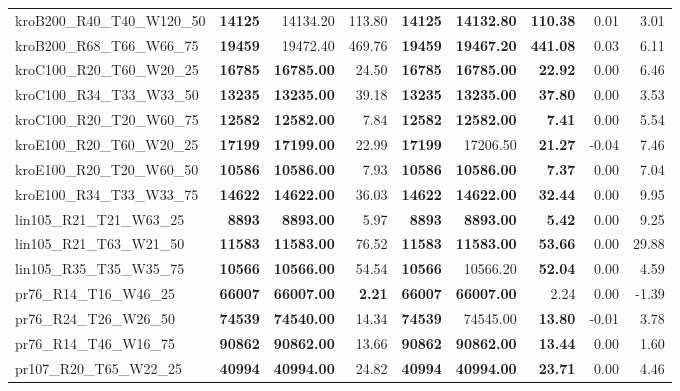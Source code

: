 \documentclass{singlecol-new}
\begin{document}
\begin{scriptsize}
\begin{longtable}{lrrrrrrrr}
		kroB200\_R40\_T40\_W120\_50 & \textbf{14125} & 14134.20 & 113.80 & \textbf{14125} & \textbf{14132.80} & \textbf{110.38} & 0.01 & 3.01 \\
		kroB200\_R68\_T66\_W66\_75 & \textbf{19459} & 19472.40 & 469.76 & \textbf{19459} & \textbf{19467.20} & \textbf{441.08} & 0.03 & 6.11 \\
		kroC100\_R20\_T60\_W20\_25 & \textbf{16785} & \textbf{16785.00} & 24.50 & \textbf{16785} & \textbf{16785.00} & \textbf{22.92} & 0.00 & 6.46 \\
		kroC100\_R34\_T33\_W33\_50 & \textbf{13235} & \textbf{13235.00} & 39.18 & \textbf{13235} & \textbf{13235.00} & \textbf{37.80} & 0.00 & 3.53 \\
		kroC100\_R20\_T20\_W60\_75 & \textbf{12582} & \textbf{12582.00} & 7.84 & \textbf{12582} & \textbf{12582.00} & \textbf{7.41} & 0.00 & 5.54 \\
		kroE100\_R20\_T60\_W20\_25 & \textbf{17199} & \textbf{17199.00} & 22.99 & \textbf{17199} & 17206.50 & \textbf{21.27} & -0.04 & 7.46 \\
		kroE100\_R20\_T20\_W60\_50 & \textbf{10586} & \textbf{10586.00} & 7.93 & \textbf{10586} & \textbf{10586.00} & \textbf{7.37} & 0.00 & 7.04 \\
		kroE100\_R34\_T33\_W33\_75 & \textbf{14622} & \textbf{14622.00} & 36.03 & \textbf{14622} & \textbf{14622.00} & \textbf{32.44} & 0.00 & 9.95 \\
		lin105\_R21\_T21\_W63\_25 & \textbf{8893} & \textbf{8893.00} & 5.97 & \textbf{8893} & \textbf{8893.00} & \textbf{5.42} & 0.00 & 9.25 \\
		lin105\_R21\_T63\_W21\_50 & \textbf{11583} & \textbf{11583.00} & 76.52 & \textbf{11583} & \textbf{11583.00} & \textbf{53.66} & 0.00 & 29.88 \\
		lin105\_R35\_T35\_W35\_75 & \textbf{10566} & \textbf{10566.00} & 54.54 & \textbf{10566} & 10566.20 & \textbf{52.04} & 0.00 & 4.59 \\
		pr76\_R14\_T16\_W46\_25 & \textbf{66007} & \textbf{66007.00} & \textbf{2.21} & \textbf{66007} & \textbf{66007.00} & 2.24 & 0.00 & -1.39 \\
		pr76\_R24\_T26\_W26\_50 & \textbf{74539} & \textbf{74540.00} & 14.34 & \textbf{74539} & 74545.00 & \textbf{13.80} & -0.01 & 3.78 \\
		pr76\_R14\_T46\_W16\_75 & \textbf{90862} & \textbf{90862.00} & 13.66 & \textbf{90862} & \textbf{90862.00} & \textbf{13.44} & 0.00 & 1.60 \\
		pr107\_R20\_T65\_W22\_25 & \textbf{40994} & \textbf{40994.00} & 24.82 & \textbf{40994} & \textbf{40994.00} & \textbf{23.71} & 0.00 & 4.46 \\

\end{longtable}
\end{scriptsize}
\end{document}
